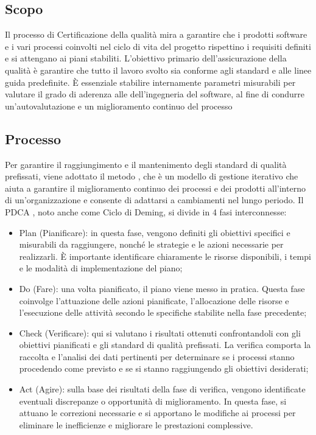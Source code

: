 \subsection{Scopo}
Il processo di Certificazione della qualità mira a garantire che i prodotti software e i vari processi coinvolti nel ciclo di vita del progetto rispettino i requisiti definiti e si attengano ai piani stabiliti. L'obiettivo primario dell'assicurazione della qualità è garantire che tutto il lavoro svolto sia conforme agli standard e alle linee guida predefinite. È essenziale stabilire internamente parametri misurabili per valutare il grado di aderenza alle  dell'ingegneria del software, al fine di condurre un'autovalutazione e un miglioramento continuo del processo

\subsection{Processo}

Per garantire il raggiungimento e il mantenimento degli standard di qualità prefissati, viene adottato il metodo , che è un modello di gestione iterativo che aiuta a garantire il miglioramento continuo dei processi e dei prodotti all'interno di un'organizzazione e consente di adattarsi a cambiamenti nel lungo periodo. Il PDCA , noto anche come Ciclo di Deming, si divide in 4 fasi interconnesse:

\begin{itemize}
    \item Plan (Pianificare): in questa fase, vengono definiti gli obiettivi specifici e misurabili da raggiungere, nonché le strategie e le azioni necessarie per realizzarli. È importante identificare chiaramente le risorse disponibili, i tempi e le modalità di implementazione del piano;
    \item Do (Fare): una volta pianificato, il piano viene messo in pratica. Questa fase coinvolge l'attuazione delle azioni pianificate, l'allocazione delle risorse e l'esecuzione delle attività secondo le specifiche stabilite nella fase precedente;
    \item Check (Verificare): qui si valutano i risultati ottenuti confrontandoli con gli obiettivi pianificati e gli standard di qualità prefissati. La verifica comporta la raccolta e l'analisi dei dati pertinenti per determinare se i processi stanno procedendo come previsto e se si stanno raggiungendo gli obiettivi desiderati;
    \item Act (Agire): sulla base dei risultati della fase di verifica, vengono identificate eventuali discrepanze o opportunità di miglioramento. In questa fase, si attuano le correzioni necessarie e si apportano le modifiche ai processi per eliminare le inefficienze e migliorare le prestazioni complessive.
\end{itemize}

